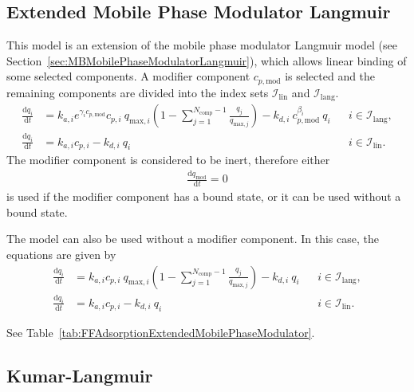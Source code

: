 \subsection{Extended Mobile Phase Modulator Langmuir}

This model is an extension of the mobile phase modulator Langmuir model (see Section~\ref{sec:MBMobilePhaseModulatorLangmuir}), which allows linear binding of some selected components. 
A modifier component $c_{p,\mathrm{mod}}$ is selected and the remaining components are divided into the index sets $\mathcal{I}_{\mathrm{lin}}$ and $\mathcal{I}_{\mathrm{lang}}$.
\begin{align*}
  \frac{\mathrm{d} q_i}{\mathrm{d} t} &= k_{a,i} e^{\gamma_i c_{p,\mathrm{mod}}} c_{p,i}\: q_{\text{max},i} \left( 1 - \sum_{j=1}^{N_{\text{comp}} - 1} \frac{q_j}{q_{\text{max},j}} \right) - k_{d,i} \: c_{p,\mathrm{mod}}^{\beta_i} \: q_i && i \in \mathcal{I}_{\mathrm{lang}}, \\
  \frac{\mathrm{d} q_i}{\mathrm{d} t} &= k_{a,i} c_{p,i} - k_{d,i} \: q_i && i \in \mathcal{I}_{\mathrm{lin}}.
\end{align*}
The modifier component is considered to be inert, therefore either
\begin{align*}
  \frac{\mathrm{d} q_{\mathrm{mod}}}{\mathrm{d} t} = 0
\end{align*}
is used if the modifier component has a bound state, or it can be used without a bound state.

The model can also be used without a modifier component.
In this case, the equations are given by
\begin{align*}
  \frac{\mathrm{d} q_i}{\mathrm{d} t} &= k_{a,i} c_{p,i}\: q_{\text{max},i} \left( 1 - \sum_{j=1}^{N_{\text{comp}} - 1} \frac{q_j}{q_{\text{max},j}} \right) - k_{d,i} \: q_i && i \in \mathcal{I}_{\mathrm{lang}}, \\
  \frac{\mathrm{d} q_i}{\mathrm{d} t} &= k_{a,i} c_{p,i} - k_{d,i} \: q_i && i \in \mathcal{I}_{\mathrm{lin}}.
\end{align*}

See Table~\ref{tab:FFAdsorptionExtendedMobilePhaseModulator}.

\subsection{Kumar-Langmuir}

